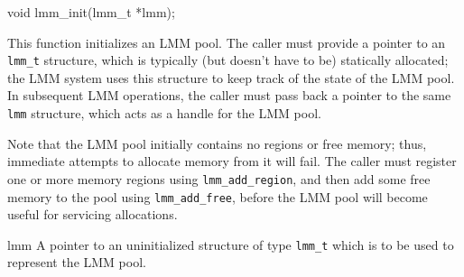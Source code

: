 \begin{apisyn}

	\funcproto void lmm_init(lmm_t *lmm);
\end{apisyn}
\begin{apidesc}
	This function initializes an LMM pool.
	The caller must provide a pointer to an {\tt lmm_t} structure,
	which is typically (but doesn't have to be) statically allocated;
	the LMM system uses this structure to keep track
	of the state of the LMM pool.
	In subsequent LMM operations,
	the caller must pass back a pointer to the same {\tt lmm} structure,
	which acts as a handle for the LMM pool.

	Note that the LMM pool initially contains no regions or free memory;
	thus, immediate attempts to allocate memory from it will fail.
	The caller must register one or more memory regions
	using {\tt lmm_add_region},
	and then add some free memory to the pool using {\tt lmm_add_free},
	before the LMM pool will become useful for servicing allocations.
\end{apidesc}
\begin{apiparm}
	\item[lmm]
		A pointer to an uninitialized structure of type {\tt lmm_t}
		which is to be used to represent the LMM pool.
\end{apiparm}

